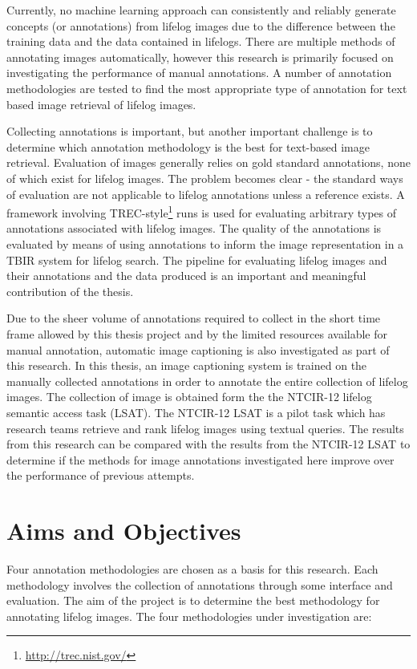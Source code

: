 Currently, no machine learning approach can consistently and reliably generate concepts (or annotations) from lifelog images due to the difference between the training data and the data contained in lifelogs. There are multiple methods of annotating images automatically, however this research is primarily focused on investigating the performance of manual annotations. A number of annotation methodologies are tested to find the most appropriate type of annotation for text based image retrieval of lifelog images.

Collecting annotations is important, but another important challenge is to determine which annotation methodology is the best for text-based image retrieval. Evaluation of images generally relies on gold standard annotations, none of which exist for lifelog images. The problem becomes clear - the standard ways of evaluation are not applicable to lifelog annotations unless a reference exists. A framework involving TREC-style\footnote{\url{http://trec.nist.gov/}} runs is used for evaluating arbitrary types of annotations associated with lifelog images. The quality of the annotations is evaluated by means of using annotations to inform the image representation in a TBIR system for lifelog search. The pipeline for evaluating lifelog images and their annotations and the data produced is an important and meaningful contribution of the thesis. 

Due to the sheer volume of annotations required to collect in the short time frame allowed by this thesis project and by the limited resources available for manual annotation, automatic image captioning is also investigated as part of this research. In this thesis, an image captioning system is trained on the manually collected annotations in order to annotate the entire collection of lifelog images. The collection of image is obtained form the the NTCIR-12 lifelog semantic access task (LSAT). The NTCIR-12 LSAT is a pilot task which has research teams retrieve and rank lifelog images using textual queries. The results from this research can be compared with the results from the NTCIR-12 LSAT to determine if the methods for image annotations investigated here improve over the performance of previous attempts.

\section{Aims and Objectives}

Four annotation methodologies are chosen as a basis for this research. Each methodology involves the collection of annotations through some interface and evaluation. The aim of the project is to determine the best methodology for annotating lifelog images. The four methodologies under investigation are: 


